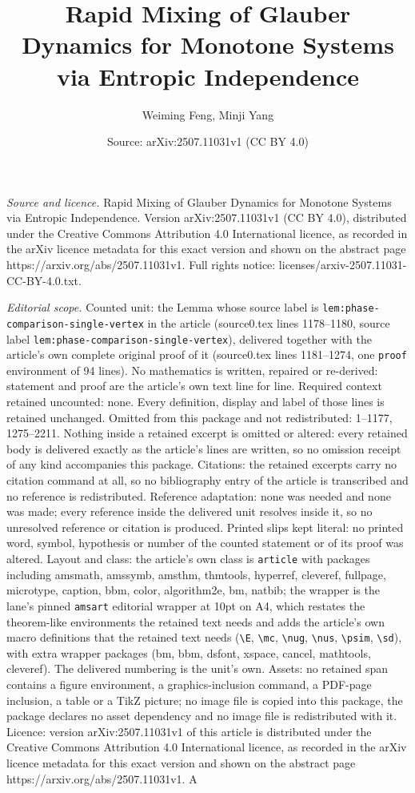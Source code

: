 \documentclass[10pt,a4paper]{amsart}
\title[Rapid Mixing of Glauber Dynamics for Monotone Systems via En]{Rapid Mixing of Glauber Dynamics for Monotone Systems via Entropic Independence}
\author{Weiming Feng, Minji Yang}
\date{Source: arXiv:2507.11031v1 (CC BY 4.0)}
\begin{document}
\maketitle

\noindent\emph{Source and licence.} Rapid Mixing of Glauber Dynamics for Monotone Systems via Entropic Independence. Version arXiv:2507.11031v1 (CC BY 4.0), distributed under the Creative Commons Attribution 4.0 International licence, as recorded in the arXiv licence metadata for this exact version and shown on the abstract page https://arxiv.org/abs/2507.11031v1. Full rights notice: licenses/arxiv-2507.11031-CC-BY-4.0.txt.\par\smallskip

\noindent\textit{Editorial scope.} Counted unit: the Lemma whose source label is \texttt{lem:phase-comparison-single-vertex} in the article (source0.tex lines 1178--1180, source label \texttt{lem:phase-comparison-single-vertex}), delivered together with the article's own complete original proof of it (source0.tex lines 1181--1274, one \texttt{proof} environment of 94 lines). No mathematics is written, repaired or re-derived: statement and proof are the article's own text line for line. Required context retained uncounted: none. Every definition, display and label of those lines is retained unchanged. Omitted from this package and not redistributed: 1--1177, 1275--2211. Nothing inside a retained excerpt is omitted or altered: every retained body is delivered exactly as the article's lines are written, so no omission receipt of any kind accompanies this package. Citations: the retained excerpts carry no citation command at all, so no bibliography entry of the article is transcribed and no reference is redistributed. Reference adaptation: none was needed and none was made; every reference inside the delivered unit resolves inside it, so no unresolved reference or citation is produced. Printed slips kept literal: no printed word, symbol, hypothesis or number of the counted statement or of its proof was altered. Layout and class: the article's own class is \texttt{article} with packages including amsmath, amssymb, amsthm, thmtools, hyperref, cleveref, fullpage, microtype, caption, bbm, color, algorithm2e, bm, natbib; the wrapper is the lane's pinned \texttt{amsart} editorial wrapper at 10pt on A4, which restates the theorem-like environments the retained text needs and adds the article's own macro definitions that the retained text needs (\texttt{\textbackslash E}, \texttt{\textbackslash mc}, \texttt{\textbackslash nug}, \texttt{\textbackslash nus}, \texttt{\textbackslash psim}, \texttt{\textbackslash sd}), with extra wrapper packages (bm, bbm, dsfont, xspace, cancel, mathtools, cleveref). The delivered numbering is the unit's own. Assets: no retained span contains a figure environment, a graphics-inclusion command, a PDF-page inclusion, a table or a TikZ picture; no image file is copied into this package, the package declares no asset dependency and no image file is redistributed with it. Licence: version arXiv:2507.11031v1 of this article is distributed under the Creative Commons Attribution 4.0 International licence, as recorded in the arXiv licence metadata for this exact version and shown on the abstract page https://arxiv.org/abs/2507.11031v1. A 
\end{document}
